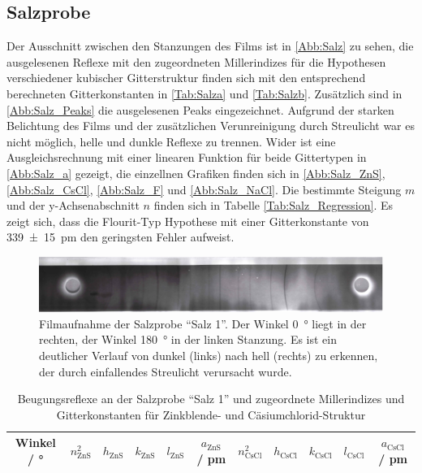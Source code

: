 \subsection{Salzprobe}
Der Ausschnitt zwischen den Stanzungen des Films ist in \autoref{Abb:Salz}
zu sehen, die ausgelesenen Reflexe mit den zugeordneten Millerindizes für die
Hypothesen verschiedener kubischer Gitterstruktur finden sich mit den entsprechend
berechneten Gitterkonstanten in \autoref{Tab:Salza} und \autoref{Tab:Salzb}.
Zusätzlich sind in \autoref{Abb:Salz_Peaks} die ausgelesenen Peaks eingezeichnet.
Aufgrund der starken Belichtung des Films und der zusätzlichen Verunreinigung durch Streulicht
war es nicht möglich, helle und dunkle Reflexe zu trennen.
Wider ist eine Ausgleichsrechnung mit einer linearen Funktion für beide Gittertypen in
\autoref{Abb:Salz_a} gezeigt, die einzellnen Grafiken finden sich in \autoref{Abb:Salz_ZnS},
\autoref{Abb:Salz_CsCl}, \autoref{Abb:Salz_F} und \autoref{Abb:Salz_NaCl}. Die bestimmte Steigung $m$ und der y-Achsenabschnitt $n$
finden sich in Tabelle \autoref{Tab:Salz_Regression}.
Es zeigt sich, dass die Flourit-Typ Hypothese mit einer Gitterkonstante von
\SI{339(15)}{\pico\metre} den geringsten Fehler aufweist.

\begin{figure}
  \centering
  \includegraphics[scale=0.5]{content/pics/Salz_film.pdf}
  \caption{Filmaufnahme der Salzprobe \enquote{Salz 1}. Der Winkel \SI{0}{\degree} liegt in der
  rechten, der Winkel \SI{180}{\degree} in der linken Stanzung. Es ist ein
  deutlicher Verlauf von dunkel (links) nach hell (rechts) zu erkennen, der durch
  einfallendes Streulicht verursacht wurde.}
  \label{Abb:Salz}
\end{figure}

\begin{table}[H]
  \centering
  \caption{Beugungsreflexe an der Salzprobe \enquote{Salz 1} und zugeordnete Millerindizes und Gitterkonstanten
  für Zinkblende- und Cäsiumchlorid-Struktur}
  \label{Tab:Salza}
  \begin{tabular}{c || c c c c c|c c c c c}
    \toprule
    Winkel / ° &
    $n_{\text{ZnS}}^{2}$ &
    $h_{\text{ZnS}}$ &
    $k_{\text{ZnS}}$ &
    $l_{\text{ZnS}}$ &
    $a_{\text{ZnS}}$ / pm &
    $n_{\text{CsCl}}^{2}$ &
    $h_{\text{CsCl}}$ &
    $k_{\text{CsCl}}$ &
    $l_{\text{CsCl}}$ &
    $a_{\text{CsCl}}$ / pm \\
    \midrule
    
    \bottomrule
  \end{tabular}
\end{table}

